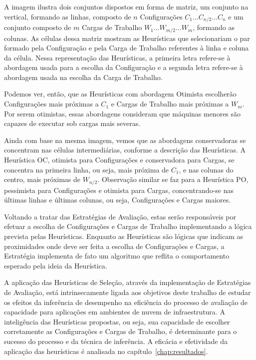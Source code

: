 A imagem ilustra dois conjuntos dispostos em forma de matriz, um conjunto 
na vertical, formando as linhas, composto de $n$ Configurações $C_1 \ldots C_{n/2} 
\ldots C_n$ e um conjunto composto de $m$ Cargas de Trabalho $W_1 \ldots W_{m/2} 
\ldots W_m$, formando as colunas. As células dessa matriz mostram as Heurísticas
que selecionariam o par formado pela Configuração e pela Carga de Trabalho referentes
à linha e coluna da célula. Nessa representação das Heurísticas, a primeira letra
refere-se à abordagem usada para a escolha da Configuração e a segunda letra refere-se 
à abordagem usada na escolha da Carga de Trabalho.
 
Podemos ver, então, que as Heurísticas com abordagem Otimista escolherão Configurações 
mais próximas a $C_1$ e Cargas de Trabalho mais próximas a $W_m$. Por serem otimistas, essas 
abordagens consideram que máquinas menores são capazes de executar sob cargas 
mais severas.

Ainda com base na mesma imagem, vemos que as abordagens conservadoras se concentram
nas células intermediárias, conforme a descrição das Heurísticas. A Heurística
OC, otimista para Configurações e conservadora para Cargas, se concentra na 
primeira linha, ou seja, mais próxima de $C_1$, e nas colunas do centro, mais
próximas de $W_{n/2}$. Observação similar se faz para a Heurística PO, pessimista 
para Configurações e otimista para Cargas, concentrando-se nas últimas linhas e 
últimas colunas, ou seja, Configurações e Cargas maiores.

Voltando a tratar das Estratégias de Avaliação, estas serão responsáveis por efetuar
a escolha de Configurações e Cargas de Trabalho implementando a lógica prevista pelas
Heurísticas. Enquanto as Heurísticas são lógicas que indicam as proximidades onde 
deve ser feita a escolha de Configurações e Cargas, a Estratégia implementa de fato
um algoritmo que reflita o comportamento esperado pela ideia da Heurística.
 
A aplicação das Heurísticas de Seleção, através da implementação de Estratégias 
de Avaliação, está intrinsecamente ligada aos objetivos deste trabalho de estudar 
os efeitos da inferência de desempenho na eficiência do processo de avaliação de 
capacidade para aplicações em ambientes de nuvem de infraestrutura. A inteligência 
das Heurísticas propostas, ou seja, sua capacidade de escolher corretamente as 
Configurações e Cargas de Trabalho, é determinante para o sucesso do processo e 
da técnica de inferência. A eficácia e efetividade da aplicação das heurísticas
é analisada no capítulo~\ref{chap:resultados}. 

